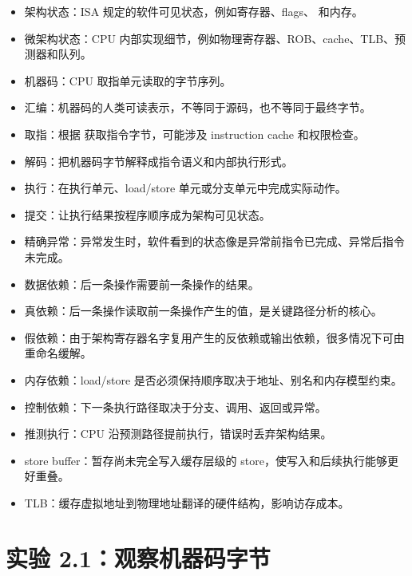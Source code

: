 \begin{itemize}
  \item 架构状态：ISA 规定的软件可见状态，例如寄存器、flags、 和内存。
  \item 微架构状态：CPU 内部实现细节，例如物理寄存器、ROB、cache、TLB、预测器和队列。
  \item 机器码：CPU 取指单元读取的字节序列。
  \item 汇编：机器码的人类可读表示，不等同于源码，也不等同于最终字节。
  \item 取指：根据  获取指令字节，可能涉及 instruction cache 和权限检查。
  \item 解码：把机器码字节解释成指令语义和内部执行形式。
  \item 执行：在执行单元、load/store 单元或分支单元中完成实际动作。
  \item 提交：让执行结果按程序顺序成为架构可见状态。
  \item 精确异常：异常发生时，软件看到的状态像是异常前指令已完成、异常后指令未完成。
  \item 数据依赖：后一条操作需要前一条操作的结果。
  \item 真依赖：后一条操作读取前一条操作产生的值，是关键路径分析的核心。
  \item 假依赖：由于架构寄存器名字复用产生的反依赖或输出依赖，很多情况下可由重命名缓解。
  \item 内存依赖：load/store 是否必须保持顺序取决于地址、别名和内存模型约束。
  \item 控制依赖：下一条执行路径取决于分支、调用、返回或异常。
  \item 推测执行：CPU 沿预测路径提前执行，错误时丢弃架构结果。
  \item store buffer：暂存尚未完全写入缓存层级的 store，使写入和后续执行能够更好重叠。
  \item TLB：缓存虚拟地址到物理地址翻译的硬件结构，影响访存成本。
\end{itemize}

\section{实验 2.1：观察机器码字节}

